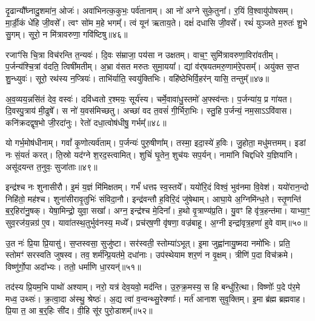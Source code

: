 दृ॒ढान्यौ᳚घ्नादु॒शमा॑न॒ ओजः॑।
अवा॑भिनत्क॒कुभः॒ पर्व॑तानाम्।
आ नो॑ अग्ने सुके॒तुना᳚।
र॒यिं वि॒श्वायु॑पोषसम्।
मा॒र्डी॒कं धे॑हि जी॒वसे᳚।
त्वꣳ सो॑म म॒हे भगम्᳚।
त्वं यून॑ ऋताय॒ते।
दक्षं॑ दधासि जी॒वसे᳚।
रथं॑ युञ्जते म॒रुतः॑ शु॒भे सु॒गम्।
सूरो॒ न मि॑त्रावरुणा॒ गवि॑ष्टिषु॥४६॥\ip

रजाꣳ॑सि चि॒त्रा विच॑रन्ति त॒न्यवः॑।
दि॒वः स॑म्राजा॒ पय॑सा न उक्षतम्।
वाच॒ꣳ॒ सुमि॑त्रावरुणा॒विरा॑वतीम्।
प॒र्जन्य॑श्चि॒त्रां व॑दति॒ त्विषी॑मतीम्।
अ॒भ्रा व॑सत मरुतः सुमा॒यया᳚।
द्यां व॑र्‌\mbox{}षयतमरु॒णाम॑रे॒पसम्᳚।
अयु॑क्त स॒प्त शु॒न्ध्युवः॑।
सूरो॒ रथ॑स्य न॒प्त्रियः॑।
ताभि॑र्याति॒ स्वयु॑क्तिभिः।
वहि॑ष्ठेभिर्वि॒हर॑न् यासि॒ तन्तुम्᳚॥४७॥\ip

अ॒व॒व्यय॒न्नसि॑तं देव॒ वस्वः॑।
दवि॑ध्वतो र॒श्मयः॒ सूर्य॑स्य।
चर्मे॒वावा॑धु॒स्तमो॑ अ॒फ्स्व॑न्तः।
प॒र्जन्या॑य॒ प्र गा॑यत।
दि॒वस्पु॒त्राय॑ मी॒ढुषे᳚।
स नो॑ य॒वस॑मिच्छतु।
अच्छा॑ वद त॒वसं॑ गी॒र्भिरा॒भिः।
स्तु॒हि प॒र्जन्यं॒ नम॒सा\-ऽऽवि॑वास।
कनि॑क्रदद्वृष॒भो जी॒रदा॑नुः।
रेतो॑ दधा॒त्वोष॑धीषु॒ गर्भम्᳚॥४८॥\ip

यो गर्भ॒मोष॑धीनाम्।
गवां᳚ कृ॒णोत्यर्व॑ताम्।
प॒र्जन्यः॑ पुरु॒षीणा᳚म्।
तस्मा॒ इदा॒स्ये॑ ह॒विः।
जु॒होता॒ मधु॑मत्तमम्।
इडां नः सं॒यतं॑ करत्।
ति॒स्रो यद॑ग्ने श॒रद॒स्त्वामित्।
शुचिं॑ घृ॒तेन॒ शुच॑यः सप॒र्यन्।
नामा॑नि चिद्दधिरे य॒ज्ञिया॑नि।
असू॑दयन्त त॒नुवः॒ सुजा॑ताः॥४९॥\ip

इन्द्र॑श्च नः शुनासीरौ।
इ॒मं य॒ज्ञं मि॑मिक्षतम्।
गर्भं॑ धत्तꣴ स्व॒स्तये᳚।
ययो॑रि॒दं विश्वं॒ भुव॑नमा वि॒वेश॑।
ययो॑रान॒न्दो निहि॑तो॒ मह॑श्च।
शुना॑सीरावृ॒तुभिः॑ संविदा॒नौ।
इन्द्र॑वन्तौ ह॒विरि॒दं जु॑षेथाम्।
आघा॒ये अ॒ग्निमि॑न्ध॒ते।
स्तृ॒णन्ति॑ ब॒र्॒हिरा॑नु॒षक्।
येषा॒मिन्द्रो॒ युवा॒ सखा᳚।
अग्न॒ इन्द्र॑श्च मे॒दिना᳚।
ह॒थो वृ॒त्राण्य॑प्र॒ति।
यु॒वꣳ हि वृ॑त्र॒हन्त॑मा।
याभ्या॒ꣳ॒ सुव॒रज॑य॒न्नग्र॑ ए॒व।
यावा॑तस्थ॒तुर्भुव॑नस्य॒ मध्ये᳚।
प्रच॑र्‌\mbox{}ष॒णी वृ॑षणा॒ वज्र॑बाहू।
अ॒ग्नी इन्द्रा॑वृत्र॒हणा॑ हुवे वाम्॥५०॥\ip\anuvakamend[मन॒ इन्द्रो॒ गवि॑ष्टिषु॒ तन्तुं॒ गर्भ॒ꣳ॒ सुजा॑ताः॒ सखा॑ स॒प्त च॑]

उ॒त नः॑ प्रि॒या प्रि॒यासु॑।
स॒प्तस्वसा॒ सुजु॑ष्टा।
सर॑स्वती॒ स्तोम्या॑\-ऽभूत्।
इ॒मा जुह्वा॑नायु॒ष्मदा नमो॑भिः।
प्रति॒ स्तोमꣳ॑ सरस्वति जुषस्व।
तव॒ शर्म॑न्प्रि॒यत॑मे॒ दधा॑नाः।
उप॑स्थेयाम शर॒णं न वृ॒क्षम्।
त्रीणि॑ प॒दा विच॑क्रमे।
विष्णु॑र्गो॒पा अदा᳚भ्यः।
ततो॒ धर्मा॑णि धा॒रयन्॑॥५१॥\ip

तद॑स्य प्रि॒यम॒भि पाथो॑ अश्याम्।
नरो॒ यत्र॑ देव॒यवो॒ मद॑न्ति।
उ॒रु॒क्र॒मस्य॒ स हि बन्धु॑रि॒त्था।
विष्णोः᳚ प॒दे प॑र॒मे मध्व॒ उथ्सः॑।
क्र॒त्वा॒दा अ॑स्थु॒ श्रेष्ठः॑।
अ॒द्य त्वा॑ व॒न्वन्थ्सु॒रेक्णाः᳚।
मर्त॑ आनाश सुवृ॒क्तिम्।
इ॒मा ब्र॑ह्म ब्रह्मवाह।
प्रि॒या त॒ आ ब॒र्॒हिः सी॑द।
वी॒हि सू॑र पुरो॒डाशम्᳚॥५२॥\ip

